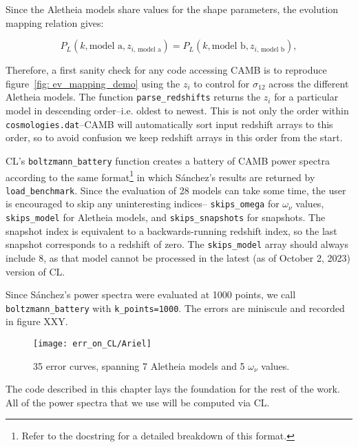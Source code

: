 Since the Aletheia models share values for the shape parameters, the
evolution mapping relation gives:

\begin{equation}
P_L(k, \text{model a}, z_{i, \, \text{model a}})
=
P_L(k, \text{model b}, z_{i, \, \text{model b}})
,\end{equation}

Therefore, a first sanity check for any code accessing CAMB is to reproduce
figure~\ref{fig: ev_mapping_demo} using the $z_i$ to control for $\sigma_{12}$
across the different Aletheia models. The function \verb|parse_redshifts|
returns the $z_i$ for a particular model in descending order--i.e. oldest
to newest. This is not only the order within \verb|cosmologies.dat|--CAMB
will automatically sort input redshift arrays to this order, so to avoid
confusion we keep redshift arrays in this order from the start.

CL's \verb|boltzmann_battery| function creates a battery of CAMB power
spectra according to the same
format\footnote{Refer to the docstring for a detailed breakdown of this
format.} in which S\'{a}nchez's results are
returned by \verb|load_benchmark|. Since the evaluation of 28 models can take
some time, the user is encouraged to skip any uninteresting indices--
\verb|skips_omega| for $\omega_\nu$ values, \verb|skips_model| for
Aletheia models, and \verb|skips_snapshots| for snapshots. The snapshot index
is equivalent to a backwards-running redshift index, so the last snapshot
corresponds to a redshift of zero. The \verb|skips_model| array should always
include 8, as that model cannot be processed in the latest (as of October 2,
2023) version of CL.

Since S\'{a}nchez's power spectra were evaluated at 1000 points, we call
\verb|boltzmann_battery| with \verb|k_points=1000|. The errors are miniscule 
and recorded in figure XXY. 

\begin{figure}[ht!]
  \centering
  \texttt{[image: err\_on\_CL/Ariel]}
  \caption[CL Consistency]{35 error curves, spanning
  	7 Aletheia models and 5 $\omega_\nu$ values.}
  \label{fig: Ariel_errs}
\end{figure}

The code described in this chapter lays the foundation for the rest of the
work. All of the power spectra that we use will be computed via CL.



